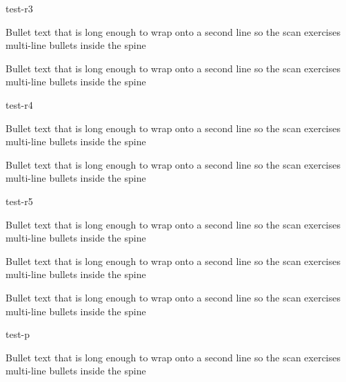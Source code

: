 \documentclass{resume}
\begin{document}
\begin{experience}
\begin{role}{test-r3}
    \item Bullet text that is long enough to wrap onto a second line so the scan exercises multi-line bullets inside the spine
    \item Bullet text that is long enough to wrap onto a second line so the scan exercises multi-line bullets inside the spine
  \end{role}
  \begin{role}{test-r4}
    \item Bullet text that is long enough to wrap onto a second line so the scan exercises multi-line bullets inside the spine
    \item Bullet text that is long enough to wrap onto a second line so the scan exercises multi-line bullets inside the spine
  \end{role}
  \begin{role}{test-r5}
    \item Bullet text that is long enough to wrap onto a second line so the scan exercises multi-line bullets inside the spine
    \item Bullet text that is long enough to wrap onto a second line so the scan exercises multi-line bullets inside the spine
    \item Bullet text that is long enough to wrap onto a second line so the scan exercises multi-line bullets inside the spine
  \end{role}
\end{experience}
\begin{projects}
  \begin{project}{test-p}
    \item Bullet text that is long enough to wrap onto a second line so the scan exercises multi-line bullets inside the spine
  \end{project}
\end{projects}
\end{document}

